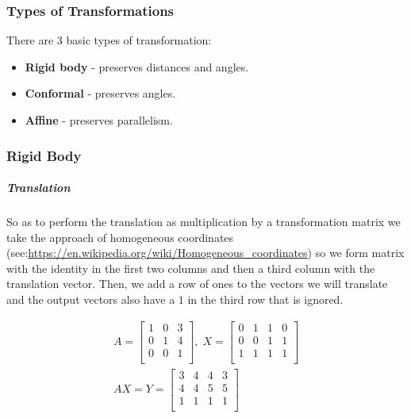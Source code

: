 \documentclass[../MathsNotesBase.tex]{subfiles}
\begin{document}
{		
		\bigskip
		\subsubsection{Types of Transformations}
		There are 3 basic types of transformation:
		\begin{itemize}
		\item{\textbf{Rigid body} - preserves distances and angles.
		}
		\item{\textbf{Conformal} - preserves angles.
		}
		\item{\textbf{Affine} - preserves parallelism.
		}
		\end{itemize}
		
		\subsubsection{Rigid Body}
		\subparagraph{Translation}
		So as to perform the translation as multiplication by a transformation matrix we take the approach of homogeneous coordinates (see:\url{https://en.wikipedia.org/wiki/Homogeneous_coordinates}) so we form matrix with the identity in the first two columns and then a third column with the translation vector. Then, we add a row of ones to the vectors we will translate and the output vectors also have a $1$ in the third row that is ignored.
		
		\begin{align*}
		A =
		\begin{bmatrix}    
		1 & 0  & 3 \\
		0 & 1  & 4 \\
		0 & 0  & 1 \\		
		\end{bmatrix}
		,\; X = 
		\begin{bmatrix}  
		0   &  1  &   1  &   0 \\
		0   &  0  &   1  &   1	\\	
		1   &  1  &   1  &   1	\\	
		\end{bmatrix} \\[10pt]
		AX = Y = 
		\begin{bmatrix}   
		3  &   4  &   4  &   3 \\
		4  &   4  &   5  &   5	\\
		1   &  1  &   1  &   1	\\
		\end{bmatrix}
		\end{align*}
		
}
\end{document}
